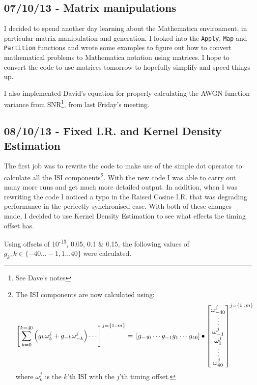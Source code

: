 \subsection{07/10/13 - Matrix manipulations}

I decided to spend another day learning about the Mathematica
environment, in particular matrix manipulation and generation. I looked
into the \texttt{Apply}, \texttt{Map} and \texttt{Partition} functions
and wrote some examples to figure out how to convert mathematical
problems to Mathematica notation using matrices. I hope to convert the
code to use matrices tomorrow to hopefully simplify and speed things up.

I also implemented David's equation for properly calculating the AWGN
function variance from SNR\footnote{See Dave's notes}, from last
Friday's meeting.

\subsection{08/10/13 - Fixed I.R. and Kernel Density Estimation}

The first job was to rewrite the code to make use of the simple dot
operator to calculate all the ISI components\footnote{The ISI components
  are now calculated using: \[
  \left [
    \sum_{k=0}^{k=40} \left ( g_k \omega_k^j + g_{-k} \omega_{-k}^j \right ) \cdots
  \right ]^{j=\{1..m\}} = \\
\left [ 
    g_{-40} \cdots g_{-1} g_{1} \cdots g_{40}
  \right ] \bullet \left [
    \begin{matrix}
  \omega_{-40}^j  \\
  \vdots          \\
  \omega_{-1}^j   \\
  \omega_{1}^j     \\
  \vdots            \\
  \omega_{40}^j    \\
    \end{matrix}
  \right ]^{j=\{1..m\}}
  \] where $\omega_{k}^j$ is the $k$'th ISI with the $j$'th timing
  offset.}. With the new code I was able to carry out many more runs and
get much more detailed output. In addition, when I was rewriting the
code I noticed a typo in the Raised Cosine I.R. that was degrading
performance in the perfectly synchronised case. With both of these
changes made, I decided to use Kernel Density Estimation to see what
effects the timing offset has.

Using offsets of 10\textsuperscript{-15}, 0.05, 0.1 \& 0.15, the
following values of $g_k, k \in \{ -40 \dots -1, 1 \dots 40 \}$ were
calculated.

